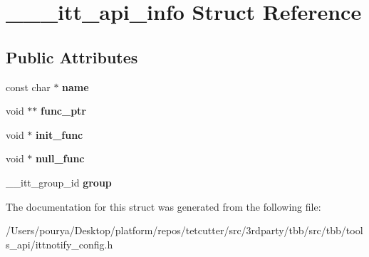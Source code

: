 \hypertarget{struct______itt__api__info}{}\section{\+\_\+\+\_\+\+\_\+itt\+\_\+api\+\_\+info Struct Reference}
\label{struct______itt__api__info}
\subsection*{Public Attributes}
\begin{DoxyCompactItemize}
\item 
\hypertarget{struct______itt__api__info_abb7f1e06b74fb586eb8d1e7570cd6263}{}const char $\ast$ {\bfseries name}\label{struct______itt__api__info_abb7f1e06b74fb586eb8d1e7570cd6263}

\item 
\hypertarget{struct______itt__api__info_a3f5d0605499d1a9911080be2fabfc18b}{}void $\ast$$\ast$ {\bfseries func\+\_\+ptr}\label{struct______itt__api__info_a3f5d0605499d1a9911080be2fabfc18b}

\item 
\hypertarget{struct______itt__api__info_a21210573f2cde6f6b8c781da860dad7b}{}void $\ast$ {\bfseries init\+\_\+func}\label{struct______itt__api__info_a21210573f2cde6f6b8c781da860dad7b}

\item 
\hypertarget{struct______itt__api__info_ab182f072fe2a2f4740be6b1d0499348f}{}void $\ast$ {\bfseries null\+\_\+func}\label{struct______itt__api__info_ab182f072fe2a2f4740be6b1d0499348f}

\item 
\hypertarget{struct______itt__api__info_a42bda2bfa667003e920bbf6995f5d375}{}\+\_\+\+\_\+itt\+\_\+group\+\_\+id {\bfseries group}\label{struct______itt__api__info_a42bda2bfa667003e920bbf6995f5d375}

\end{DoxyCompactItemize}


The documentation for this struct was generated from the following file\+:\begin{DoxyCompactItemize}
\item 
/\+Users/pourya/\+Desktop/platform/repos/tetcutter/src/3rdparty/tbb/src/tbb/tools\+\_\+api/ittnotify\+\_\+config.\+h\end{DoxyCompactItemize}

